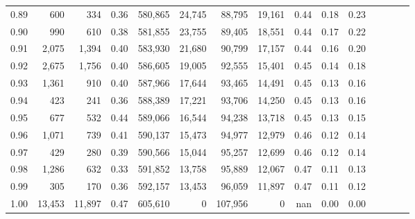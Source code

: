 \begin{tabular}{rrrcrrrrrrrrrrr}
0.89 &     600 &     334 &                                       0.36 &  580,865 &   24,745 &   88,795 &   19,161 &  0.44 &  0.18 &                         0.23 \\
0.90 &     990 &     610 &                                       0.38 &  581,855 &   23,755 &   89,405 &   18,551 &  0.44 &  0.17 &                         0.22 \\
0.91 &   2,075 &   1,394 &                                       0.40 &  583,930 &   21,680 &   90,799 &   17,157 &  0.44 &  0.16 &                         0.20 \\
0.92 &   2,675 &   1,756 &                                       0.40 &  586,605 &   19,005 &   92,555 &   15,401 &  0.45 &  0.14 &                         0.18 \\
0.93 &   1,361 &     910 &                                       0.40 &  587,966 &   17,644 &   93,465 &   14,491 &  0.45 &  0.13 &                         0.16 \\
0.94 &     423 &     241 &                                       0.36 &  588,389 &   17,221 &   93,706 &   14,250 &  0.45 &  0.13 &                         0.16 \\
0.95 &     677 &     532 &                                       0.44 &  589,066 &   16,544 &   94,238 &   13,718 &  0.45 &  0.13 &                         0.15 \\
0.96 &   1,071 &     739 &                                       0.41 &  590,137 &   15,473 &   94,977 &   12,979 &  0.46 &  0.12 &                         0.14 \\
0.97 &     429 &     280 &                                       0.39 &  590,566 &   15,044 &   95,257 &   12,699 &  0.46 &  0.12 &                         0.14 \\
0.98 &   1,286 &     632 &                                       0.33 &  591,852 &   13,758 &   95,889 &   12,067 &  0.47 &  0.11 &                         0.13 \\
0.99 &     305 &     170 &                                       0.36 &  592,157 &   13,453 &   96,059 &   11,897 &  0.47 &  0.11 &                         0.12 \\
1.00 &  13,453 &  11,897 &                                       0.47 &  605,610 &        0 &  107,956 &        0 &   nan &  0.00 &                         0.00 \\
\bottomrule
\end{tabular}
